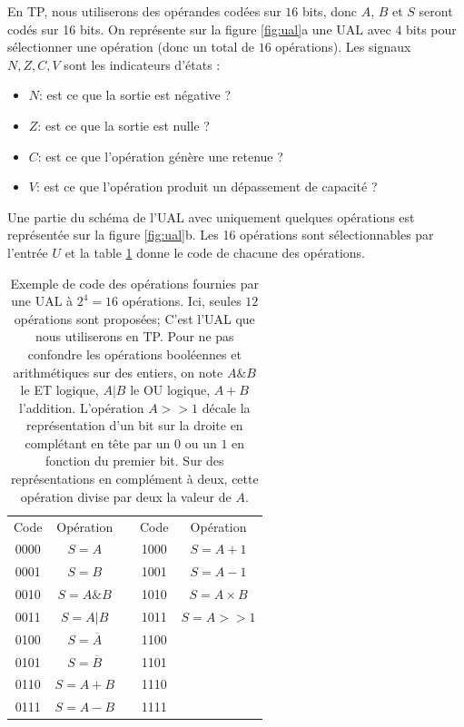 En TP, nous utiliserons des opérandes codées sur $16$ bits, donc $A$, $B$ et $S$ seront codés sur 16 bits. On représente sur la figure \ref{fig:ual}a une UAL avec $4$ bits pour sélectionner une opération (donc un total de $16$ opérations). Les signaux $N, Z, C, V$ sont les indicateurs d'états :
\begin{itemize}
\item $N$: est ce que la sortie est négative ?
\item $Z$: est ce que la sortie est nulle ?
\item $C$: est ce que l'opération génère une retenue ?
\item $V$: est ce que l'opération produit un dépassement de capacité ?
\end{itemize}
Une partie du schéma de l'UAL avec uniquement quelques opérations est représentée sur la figure \ref{fig:ual}b. Les 16 opérations sont sélectionnables par l'entrée $U$ et la table \ref{table:ual} donne le code de chacune des opérations.

\begin{table}[htbp]
\centering\begin{tabular}{c|ccc|c}
Code & Opération & & Code & Opération\\
\cline{0-1}
0000 & $S = A$ & & 1000 & $S = A+1$\\
0001 & $S = B$ & & 1001 & $S = A-1$\\
0010 & $S = A\& B$ & & 1010 & $S = A \times B$\\
0011 & $S = A|B$& &1011 & $S = A >> 1$\\
0100 & $S = \overline{A}$ & &1100 & \\
0101 & $S = \overline{B}$ & &1101 & \\
0110 & $S = A + B$ & & 1110 & \\
0111 & $S = A - B$& & 1111 & 
\end{tabular}
\caption{\label{table:ual} Exemple de code des opérations fournies par une UAL à $2^4 = 16$ opérations. Ici, seules $12$ opérations sont proposées; C'est l'UAL que nous utiliserons en TP. Pour ne pas confondre les opérations booléennes et arithmétiques sur des entiers, on note $A\&B$ le ET logique, $A|B$ le OU logique, $A+B$ l'addition. L'opération $A >> 1$ décale la représentation d'un bit sur la droite en complétant en tête par un $0$ ou un $1$ en fonction du premier bit. Sur des représentations en complément à deux, cette opération divise par deux la valeur de $A$.}
\end{table}


